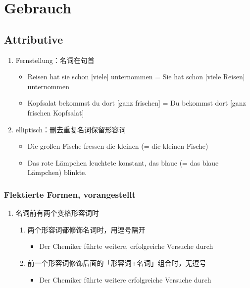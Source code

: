 \documentclass[UTF8]{report}
\begin{document}
\section{Gebrauch}
\subsection{Attributive}
\begin{enumerate}
    \item Fernstellung：名词在句首
    \begin{itemize}
        \item Reisen hat sie schon [viele] unternommen = Sie hat schon [viele Reisen] unternommen
        \item Kopfsalat bekommst du dort [ganz frischen] = Du bekommst dort [ganz frischen Kopfsalat]
    \end{itemize}
    \item elliptisch：删去重复名词保留形容词
    \begin{itemize}
        \item Die großen Fische fressen die kleinen (= die kleinen Fische)
        \item Das rote Lämpchen leuchtete konstant, das blaue (= das blaue Lämpchen) blinkte.
    \end{itemize}
\end{enumerate}




\subsubsection{Flektierte Formen, vorangestellt}
\begin{enumerate}
    \item 名词前有两个变格形容词时
    \begin{enumerate}
        \item 两个形容词都修饰名词时，用逗号隔开
        \begin{itemize}
            \item Der Chemiker führte weitere, erfolgreiche Versuche durch
        \end{itemize}
        \item 前一个形容词修饰后面的「形容词+名词」组合时，无逗号
        \begin{itemize}
            \item Der Chemiker führte weitere erfolgreiche Versuche durch
        \end{itemize}
    \end{enumerate}
\end{enumerate}
\end{document}
